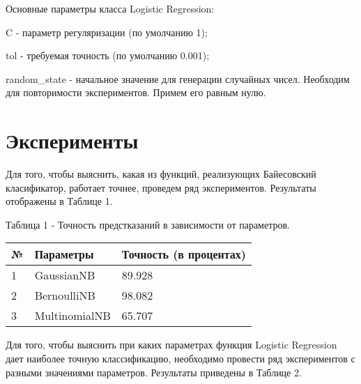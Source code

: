\documentclass[a4paper,12pt]{article}
\begin{document}
	\vspace{0.5cm}
	Основные параметры класса Logistic Regression:
	
	\vspace{0.5cm}
	C - параметр регуляризации (по умолчанию 1);

	\vspace{0.5cm}
	tol - требуемая точность (по умолчанию 0.001);
	
	\vspace{0.5cm}
	random\_state - начальное значение для генерации случайных чисел. Необходим для повторимости экспериментов. Примем его равным нулю.


	
\newpage\section{Эксперименты}
	Для того, чтобы выяснить, какая из функций, реализующих Байесовский класификатор, работает точнее, проведем ряд экспериментов. Результаты отображены в Таблице 1.
	
	\vspace{0.5cm}
	Таблица 1 - Точность предстказаний в зависимости от параметров.
\begin{longtable}{|p{1cm}|p{9cm}|p{3cm}|}
\hline 
№ & Параметры & Точность (в процентах) \\ 
\hline 
1 & GaussianNB & 89.928 \\
\hline
2 & BernoulliNB & 98.082 \\
\hline 
3 & MultinomialNB & 65.707 \\
\hline
\end{longtable}	
	
	Для того, чтобы выяснить при каких параметрах функция Logistic Regression дает наиболее точную классификацию, необходимо провести ряд экспериментов с разными значениями параметров. Результаты приведены в Таблице 2.
	
\end{document}
